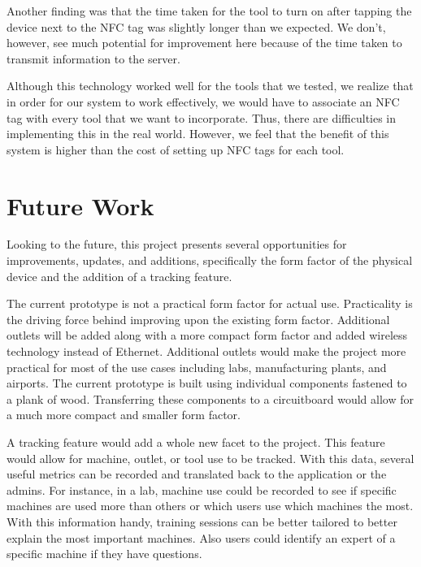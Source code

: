 \documentclass{sigchi}
\begin{document}
Another finding was that the time taken for the tool to turn on after tapping the device next to the NFC tag was slightly longer than we expected. We don't, however, see much potential for improvement here because of the time taken to transmit information to the server.

Although this technology worked well for the tools that we tested, we realize that in order for our system to work effectively, we would have to associate an NFC tag with every tool that we want to incorporate. Thus, there are difficulties in implementing this in the real world. However, we feel that the benefit of this system is higher than the cost of setting up NFC tags for each tool.

\section{Future Work}
Looking to the future, this project presents several opportunities for improvements, updates, and additions, specifically the form factor of the physical device and the addition of a tracking feature. 

The current prototype is not a practical form factor for actual use. Practicality is the driving force behind improving upon the existing form factor. Additional outlets will be added along with a more compact form factor and added wireless technology instead of Ethernet. Additional outlets would make the project more practical for most of the use cases including labs, manufacturing plants, and airports. The current prototype is built using individual components fastened to a plank of wood. Transferring these components to a circuitboard would allow for a much more compact and smaller form factor. 

A tracking feature would add a whole new facet to the project. This feature would allow for machine, outlet, or tool use to be tracked. With this data, several useful metrics can be recorded and translated back to the application or the admins. For instance, in a lab, machine use could be recorded to see if specific machines are used more than others or which users use which machines the most. With this information handy, training sessions can be better tailored to better explain the most important machines.  Also users could identify an expert of a specific machine if they have questions.
\end{document}
